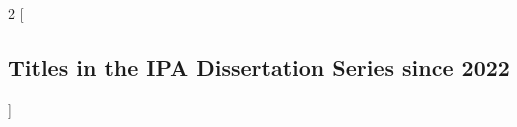 %
%
%
%
%
%
%
%


\newcommand*{\promitem}[4]{\noindent \textbf{#1}. \emph{#2}. #3.~\mbox{#4}\medskip}

\clearpage \pagestyle{empty}

\setlength{\columnsep}{2em}
\begin{multicols}{2}
        [\subsection*{Titles in the IPA Dissertation Series since 2022}]












\end{multicols}
